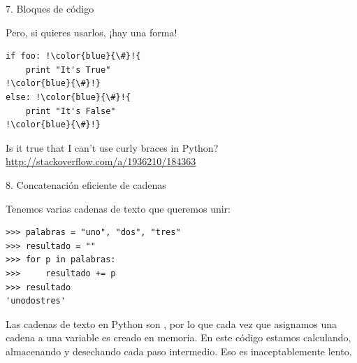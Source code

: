 \documentclass[14pt]{beamer}
\begin{document}
\begin{frame}[fragile]{7. Bloques de código}
  \begin{alertblock}{}
    \centering
    Pero, si  quieres usarlos, ¡hay una forma!
  \end{alertblock}

\begin{exampleblock}{}
    \small
    \begin{lstlisting}[escapechar=!]
if foo: !\color{blue}{\#}!{
    print "It's True"
!\color{blue}{\#}!}
else: !\color{blue}{\#}!{
    print "It's False"
!\color{blue}{\#}!}
    \end{lstlisting}
  \end{exampleblock}

  \small
  \begin{block}{\centering Is it true that I can't use curly braces in Python?}
    \centering
    \url{http://stackoverflow.com/a/1936210/184363}
  \end{block}
\end{frame}

\begin{frame}[fragile]{8. Concatenación eficiente de cadenas}
  \small
  \begin{exampleblock}
    {Tenemos varias cadenas de texto que queremos unir:}
    \small
    \begin{lstlisting}
>>> palabras = "uno", "dos", "tres"
>>> resultado = ""
>>> for p in palabras:
>>>     resultado += p
>>> resultado
'unodostres'
    \end{lstlisting}
  \end{exampleblock}

  \begin{block}{}
    Las cadenas de texto en Python son , por lo
    que cada vez que asignamos una cadena a una variable  es creado en memoria. En este código estamos
    calculando, almacenando y desechando cada paso intermedio.
    Eso es inaceptablemente lento.
  \end{block}
\end{frame}
\end{document}
